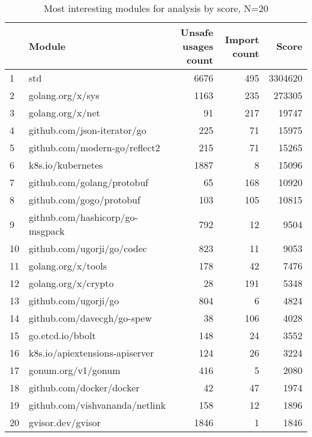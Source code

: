 \begin{table}
    \centering
    \caption{Most interesting modules for analysis by score, N=20}
    \label{tbl:most-interesting-modules-by-score}
    \begin{tabular}{llrrr}
        \toprule
        {} &                           Module & Unsafe usages count & Import count &    Score \\
        \midrule
        1  &                              std &                6676 &          495 &  3304620 \\
        2  &                 golang.org/x/sys &                1163 &          235 &   273305 \\
        3  &                 golang.org/x/net &                  91 &          217 &    19747 \\
        4  &      github.com/json-iterator/go &                 225 &           71 &    15975 \\
        5  &    github.com/modern-go/reflect2 &                 215 &           71 &    15265 \\
        6  &                k8s.io/kubernetes &                1887 &            8 &    15096 \\
        7  &       github.com/golang/protobuf &                  65 &          168 &    10920 \\
        8  &         github.com/gogo/protobuf &                 103 &          105 &    10815 \\
        9  &  github.com/hashicorp/go-msgpack &                 792 &           12 &     9504 \\
        10 &       github.com/ugorji/go/codec &                 823 &           11 &     9053 \\
        11 &               golang.org/x/tools &                 178 &           42 &     7476 \\
        12 &              golang.org/x/crypto &                  28 &          191 &     5348 \\
        13 &             github.com/ugorji/go &                 804 &            6 &     4824 \\
        14 &       github.com/davecgh/go-spew &                  38 &          106 &     4028 \\
        15 &                 go.etcd.io/bbolt &                 148 &           24 &     3552 \\
        16 &   k8s.io/apiextensions-apiserver &                 124 &           26 &     3224 \\
        17 &               gonum.org/v1/gonum &                 416 &            5 &     2080 \\
        18 &         github.com/docker/docker &                  42 &           47 &     1974 \\
        19 &   github.com/vishvananda/netlink &                 158 &           12 &     1896 \\
        20 &                gvisor.dev/gvisor &                1846 &            1 &     1846 \\
        \bottomrule
    \end{tabular}
\end{table}


